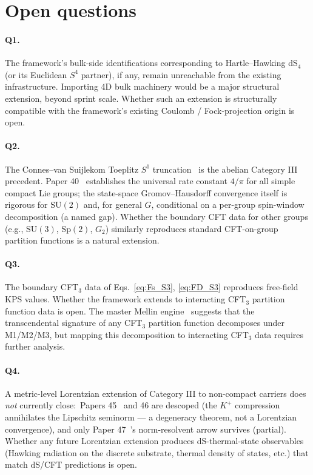 \documentclass[11pt,a4paper]{article}
\theoremstyle{plain}
\theoremstyle{definition}
\begin{document}
\section{Open questions}
\label{sec:open}

\paragraph{Q1.} The framework's bulk-side identifications corresponding
to Hartle--Hawking dS$_{4}$ (or its Euclidean $S^{4}$ partner), if any,
remain unreachable from the existing infrastructure. Importing
4D bulk machinery would be a major structural extension, beyond
sprint scale.
Whether such an extension is structurally compatible with the
framework's existing Coulomb / Fock-projection origin is open.

\paragraph{Q2.} The Connes--van Suijlekom Toeplitz $S^{1}$
truncation~\cite{connes_vs2021} is the abelian Category III precedent.
Paper 40~\cite{paper40} establishes the universal rate constant $4/\pi$
for all simple compact Lie groups; the state-space Gromov--Hausdorff
convergence itself is rigorous for $\mathrm{SU}(2)$ and, for general $G$,
conditional on a per-group spin-window decomposition (a named gap). Whether the
boundary CFT data for other groups (e.g., $\mathrm{SU}(3)$,
$\mathrm{Sp}(2)$, $G_{2}$) similarly reproduces standard CFT-on-group
partition functions is a natural extension.

\paragraph{Q3.} The boundary CFT$_{3}$ data of Eqs.~\eqref{eq:Fs_S3},
\eqref{eq:FD_S3} reproduces free-field KPS values. Whether the framework
extends to interacting CFT$_{3}$ partition function data is open. The
master Mellin engine~\cite{paper18, paper32} suggests that the
transcendental signature of any CFT$_{3}$ partition function decomposes
under M1/M2/M3, but mapping this decomposition to interacting CFT$_{3}$
data requires further analysis.

\paragraph{Q4.} A metric-level Lorentzian extension of Category III to
non-compact carriers does \emph{not} currently close:\ Papers
45~\cite{paper45} and 46 are descoped (the $K^{+}$ compression
annihilates the Lipschitz seminorm --- a degeneracy theorem, not a
Lorentzian convergence), and only Paper 47~\cite{paper47}'s
norm-resolvent arrow survives (partial). Whether any future Lorentzian
extension produces dS-thermal-state observables (Hawking radiation on
the discrete substrate, thermal density of states, etc.) that match
dS/CFT predictions is open.
\end{document}

